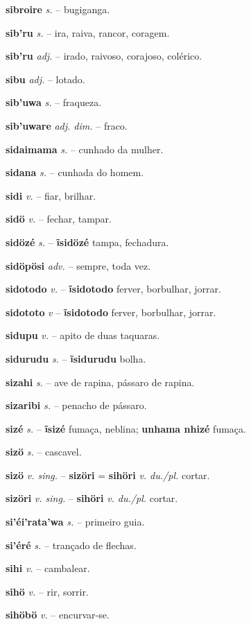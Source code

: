 \textbf{sibroire} \textit{s.} -- bugiganga.

\textbf{sib'ru} \textit{s.} -- ira, raiva, rancor, coragem.

\textbf{sib'ru} \textit{adj.} -- irado, raivoso, corajoso, colérico.

\textbf{sibu} \textit{adj.} -- lotado.

\textbf{sib'uwa} \textit{s.} -- fraqueza.

\textbf{sib'uware} \textit{adj. dim.} -- fraco.

\textbf{sidaimama} \textit{s.} -- cunhado da mulher.

\textbf{sidana} \textit{s.} -- cunhada do homem.

\textbf{sidi} \textit{v.} -- fiar, brilhar.

\textbf{sidö} \textit{v.} -- fechar, tampar.

\textbf{sidözé} \textit{s.} -- \textbf{ĩsidözé} tampa, fechadura.

\textbf{sidöpösi} \textit{adv.} -- sempre, toda vez.

\textbf{sidotodo} \textit{v.} -- \textbf{ĩsidotodo} ferver, borbulhar, jorrar.

\textbf{sidototo} \textit{v} -- \textbf{ĩsidotodo} ferver, borbulhar, jorrar.

\textbf{sidupu} \textit{v.} -- apito de duas taquaras.

\textbf{sidurudu} \textit{s.} -- \textbf{ĩsidurudu} bolha.

\textbf{sizahi} \textit{s.} -- ave de rapina, pássaro de rapina.

\textbf{sizaribi} \textit{s.} -- penacho de pássaro.

\textbf{sizé} \textit{s.} -- \textbf{ĩsizé} fumaça, neblina; \textbf{unhama nhizé} fumaça.

\textbf{sizö} \textit{s.} -- cascavel.

\textbf{sizö} \textit{v. sing.} -- \textbf{sizöri} = \textbf{sihöri} \textit{v. du./pl.} cortar.

\textbf{sizöri} \textit{v. sing.} -- \textbf{sihöri} \textit{v. du./pl.} cortar.

\textbf{si'éi'rata'wa} \textit{s.} -- primeiro guia.

\textbf{si'éré} \textit{s.} -- trançado de flechas.

\textbf{sihi} \textit{v.} -- cambalear.

\textbf{sihö} \textit{v.} -- rir, sorrir.

\textbf{sihöbö} \textit{v.} -- encurvar-se.


